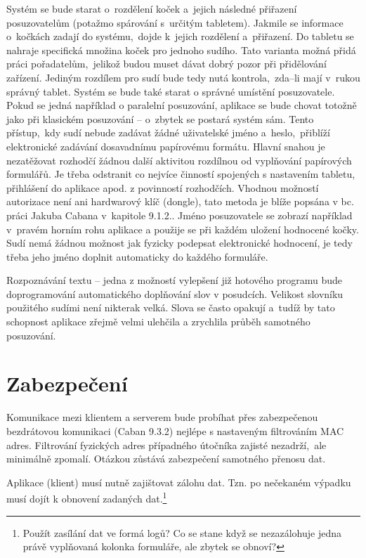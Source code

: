 \documentclass[11pt, oneside]{fithesis2}
\begin{document}
Systém se bude starat o~rozdělení koček a~jejich následné přiřazení posuzovatelům (potažmo spárování s~určitým tabletem). Jakmile se informace o~kočkách zadají do systému,~dojde k~jejich rozdělení a~přiřazení. Do tabletu se nahraje specifická množina koček pro jednoho sudího.
Tato varianta možná přidá práci pořadatelům,~jelikož budou muset dávat dobrý pozor při přidělování zařízení. Jediným rozdílem pro sudí bude tedy nutá kontrola,~zda--li mají v~rukou správný tablet.
Systém se bude také starat o správné umístění posuzovatele. Pokud se jedná například o paralelní posuzování, aplikace se bude chovat totožně jako při klasickém posuzování -- o~zbytek se postará systém sám.
Tento přístup,~kdy sudí nebude zadávat žádné uživatelské jméno a~heslo,~přiblíží elektronické zadávání dosavadnímu papírovému formátu.
Hlavní snahou je nezatěžovat rozhodčí žádnou další aktivitou rozdílnou od vyplňování papírových formulářů. Je třeba odstranit co nejvíce činností spojených s nastavením tabletu, přihlášení do aplikace apod. z povinností rozhodčích.
Vhodnou možností autorizace není ani hardwarový klíč (dongle), tato metoda je blíže popsána v bc. práci Jakuba Cabana v~kapitole 9.1.2..
Jméno posuzovatele se zobrazí například v~pravém horním rohu aplikace 
a použije se při každém uložení hodnocené kočky. Sudí nemá žádnou možnost jak fyzicky podepsat elektronické hodnocení, je tedy třeba jeho jméno doplnit automaticky do každého formuláře.
\linebreak

Rozpoznávání textu -- jedna z možností vylepšení již hotového programu bude doprogramování automatického doplňování slov v posudcích.
Velikost slovníku použitého sudími není nikterak velká. Slova se často opakují a~tudíž by tato schopnost aplikace zřejmě velmi ulehčila a zrychlila průběh samotného posuzování.

\chapter{Zabezpečení}

Komunikace mezi klientem a serverem bude probíhat přes zabezpečenou bezdrátovou komunikaci (Caban 9.3.2) nejlépe s nastaveným filtrováním MAC adres.
Filtrování fyzických adres případného útočníka zajisté nezadrží,~ale minimálně zpomalí.
Otázkou zůstává zabezpečení samotného přenosu dat.

Aplikace (klient) musí nutně zajištovat zálohu dat.
Tzn. po nečekaném výpadku musí dojít k obnovení zadaných dat.\footnote{Použít zasílání dat ve formá logů? Co se stane když se nezazálohuje jedna právě vyplňovaná kolonka formuláře, ale zbytek se obnoví?}
\linebreak
\end{document}
